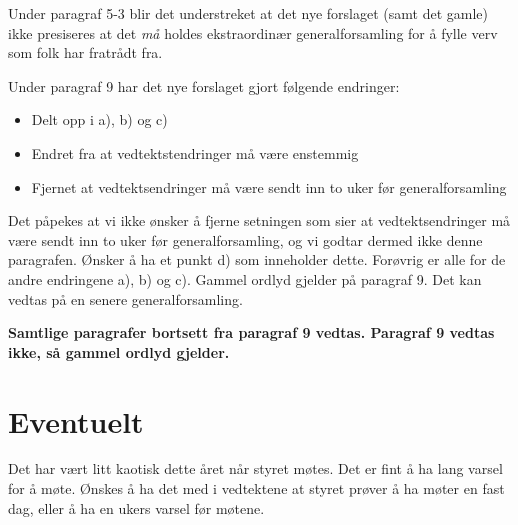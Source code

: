 \documentclass[a4paper,norsk]{article}
\begin{document}
Under paragraf 5-3 blir det understreket at det nye forslaget (samt det gamle) ikke presiseres at det \textit{må} holdes ekstraordinær generalforsamling for å fylle verv som folk har fratrådt fra.

Under paragraf 9 har det nye forslaget gjort følgende endringer: 
\begin{itemize}
	\item Delt opp i a), b) og c)
	\item Endret fra at vedtektstendringer må være enstemmig
	\item Fjernet at vedtektsendringer må være sendt inn to uker før generalforsamling
\end{itemize}
Det påpekes at vi ikke ønsker å fjerne setningen som sier at vedtektsendringer må være sendt inn to uker før generalforsamling, og vi godtar dermed ikke denne paragrafen. Ønsker å ha et punkt d) som inneholder dette. Forøvrig er alle for de andre endringene a), b) og c). Gammel ordlyd gjelder på paragraf 9. Det kan vedtas på en senere generalforsamling.

\textbf{Samtlige paragrafer bortsett fra paragraf 9 vedtas. Paragraf 9 vedtas ikke, så gammel ordlyd gjelder.}

\section{Eventuelt}
Det har vært litt kaotisk dette året når styret møtes. Det er fint å ha lang varsel for å møte. Ønskes å ha det med i vedtektene at styret prøver å ha møter en fast dag, eller å ha en ukers varsel før møtene. 
\end{document}
